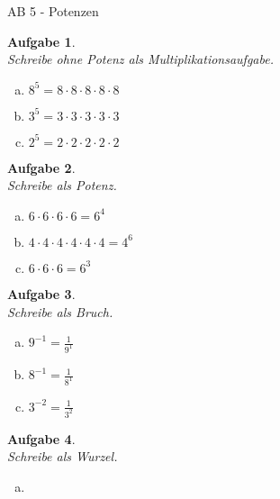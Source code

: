 \documentclass[12pt,fleqn]{article}
\theoremstyle{aufg}
\newtheorem{aufgabe}{Aufgabe}
\theoremstyle{bsp}
\begin{document}
 
    \begin{flushleft}
\begin{center}AB 5 - Potenzen\end{center}\begin{aufgabe} ~ \\ 
Schreibe ohne Potenz als Multiplikationsaufgabe. \\ 
\begin{multicols}{3} 
\begin{enumerate}[a)] 
\item 
$8^{5}=$$8\cdot8\cdot8\cdot8\cdot8$
\item 
$3^{5}=$$3\cdot3\cdot3\cdot3\cdot3$
\item 
$2^{5}=$$2\cdot2\cdot2\cdot2\cdot2$
\end{enumerate} 
\end{multicols} 
\end{aufgabe} 
\begin{aufgabe} ~ \\ 
Schreibe als Potenz. \\ 
\begin{multicols}{3} 
\begin{enumerate}[a)] 
\item 
$6\cdot6\cdot6\cdot6=$$6^{4}$
\item 
$4\cdot4\cdot4\cdot4\cdot4\cdot4=$$4^{6}$
\item 
$6\cdot6\cdot6=$$6^{3}$
\end{enumerate} 
\end{multicols} 
\end{aufgabe} 
\begin{aufgabe} ~ \\ 
Schreibe als Bruch. \\ 
\begin{multicols}{3} 
\begin{enumerate}[a)] 
\item 
$9^{-1}=$$\frac{1}{9^{1}}$
\item 
$8^{-1}=$$\frac{1}{8^{1}}$
\item 
$3^{-2}=$$\frac{1}{3^{2}}$
\end{enumerate} 
\end{multicols} 
\end{aufgabe} 
\begin{aufgabe} ~ \\ 
Schreibe als Wurzel. \\ 
\begin{multicols}{3} 
\begin{enumerate}[a)] 
\item 

\end{enumerate}
\end{multicols}
\end{aufgabe}
\end{flushleft}
\end{document}
